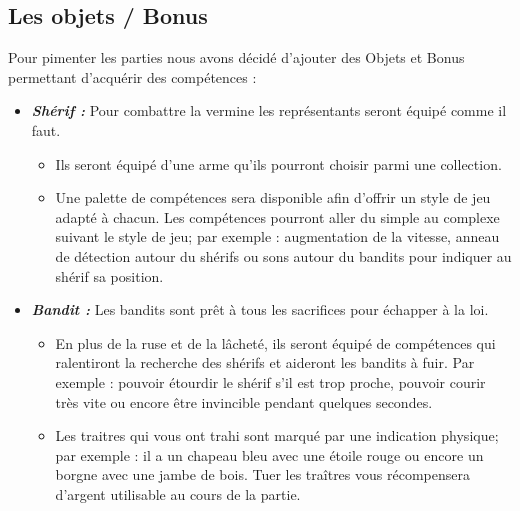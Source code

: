 \documentclass[12pt]{report}
\begin{document}
            \subsection{Les objets / Bonus}
                Pour pimenter les parties nous avons décidé d'ajouter des Objets et Bonus permettant d'acquérir des compétences : \\
                \begin{itemize}[label=$\square$]
                    \item{\textbf{\textit{Shérif :}}} Pour combattre la     vermine les représentants      seront équipé       comme il faut. 
                        \begin{itemize}
                            \item Ils seront équipé d’une arme qu’ils pourront choisir parmi une collection.
                            \item Une palette de compétences sera disponible afin d'offrir un style de jeu adapté à chacun. Les compétences pourront aller du simple au complexe suivant le style de jeu; par exemple : augmentation de la vitesse, anneau de détection autour du shérifs ou sons autour du bandits pour indiquer au shérif sa position. \\
                    \end{itemize}
                    \item{\textbf{\textit{Bandit :}}} Les bandits sont     prêt à tous les sacrifices pour échapper à la     loi.
                        \begin{itemize}
                            \item En plus de la ruse et de la lâcheté, ils seront équipé de compétences qui ralentiront la recherche des shérifs et aideront les bandits à fuir. Par exemple : pouvoir étourdir le shérif s’il est trop proche, pouvoir courir très vite ou encore être invincible pendant quelques secondes.
                            \item Les traitres qui vous ont trahi sont marqué par une indication physique; par exemple : il a un chapeau bleu avec une étoile rouge ou encore un borgne avec une jambe de bois.
                            Tuer les traîtres vous récompensera d’argent utilisable au cours de la partie.
                        \end{itemize}
                \end{itemize}
\end{document}
